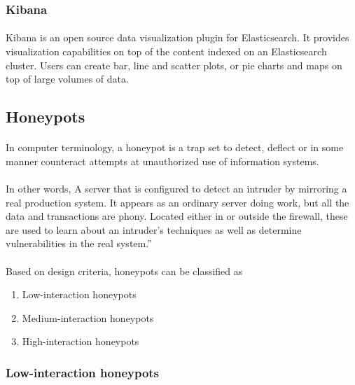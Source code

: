 \documentclass{article}
\begin{document}
\subsubsection{Kibana}

\paragraph{}
Kibana is an open source data visualization plugin for Elasticsearch. It provides visualization capabilities on top of the content indexed on an Elasticsearch cluster. Users can create bar, line and scatter plots, or pie charts and maps on top of large volumes of data.

\subsection{Honeypots}

\paragraph{}
In computer terminology, a honeypot is a trap set to detect, deflect or in some manner counteract attempts at unauthorized use of information systems.

\paragraph{}
In other words, A server that is configured to detect an intruder by mirroring a real production system. It appears as an ordinary server doing work, but all the data and transactions are phony. Located either in or outside the firewall, these are used to learn about an intruder’s techniques as well as determine vulnerabilities in the real system.”

\paragraph{}
Based on design criteria, honeypots can be classified as

\begin{enumerate}
\item Low-interaction honeypots
\item Medium-interaction honeypots
\item High-interaction honeypots
\end{enumerate}

\subsubsection{Low-interaction honeypots}
\end{document}
